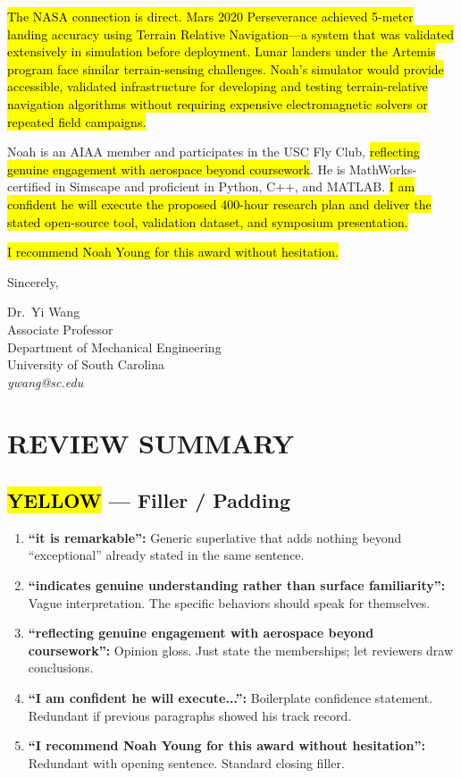 \documentclass[12pt]{article}
\newcommand{\ylw}[1]{{\sethlcolor{yellow}\hl{#1}}}
\newcommand{\blu}[1]{{\sethlcolor{cyan!30}\hl{#1}}}
\begin{document}
\blu{The NASA connection is direct. Mars 2020 Perseverance achieved 5-meter landing accuracy using Terrain Relative Navigation---a system that was validated extensively in simulation before deployment. Lunar landers under the Artemis program face similar terrain-sensing challenges. Noah's simulator would provide accessible, validated infrastructure for developing and testing terrain-relative navigation algorithms without requiring expensive electromagnetic solvers or repeated field campaigns.}

Noah is an AIAA member and participates in the USC Fly Club, \ylw{reflecting genuine engagement with aerospace beyond coursework}. He is MathWorks-certified in Simscape and proficient in Python, C++, and MATLAB. \ylw{I am confident he will execute the proposed 400-hour research plan and deliver the stated open-source tool, validation dataset, and symposium presentation.}

\ylw{I recommend Noah Young for this award without hesitation.}

\vspace{0.8em}

\noindent
Sincerely,

\vspace{1.5em}

\noindent
Dr.\ Yi Wang\\
Associate Professor\\
Department of Mechanical Engineering\\
University of South Carolina\\
\textit{ywang@sc.edu}

\newpage

\section*{REVIEW SUMMARY}

\subsection*{\ylw{YELLOW} --- Filler / Padding}

\begin{enumerate}
\item \textbf{``it is remarkable'':} Generic superlative that adds nothing beyond ``exceptional'' already stated in the same sentence.
\item \textbf{``indicates genuine understanding rather than surface familiarity'':} Vague interpretation. The specific behaviors should speak for themselves.
\item \textbf{``reflecting genuine engagement with aerospace beyond coursework'':} Opinion gloss. Just state the memberships; let reviewers draw conclusions.
\item \textbf{``I am confident he will execute...'':} Boilerplate confidence statement. Redundant if previous paragraphs showed his track record.
\item \textbf{``I recommend Noah Young for this award without hesitation'':} Redundant with opening sentence. Standard closing filler.
\end{enumerate}
\end{document}
